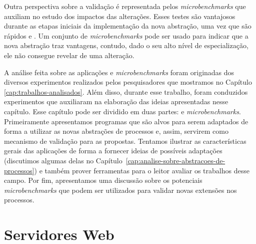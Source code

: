Outra perspectiva sobre a validação é representada pelos
\textit{microbenchmarks} que auxiliam no estudo dos impactos das alterações.
Esses testes são vantajosos durante as etapas iniciais da implementação da nova abstração, uma
vez que são rápidos e . Um conjunto de
\textit{microbenchmarks} pode ser usado para indicar que a nova abstração
traz vantagens, contudo, dado o seu alto nível de especialização, ele não
consegue revelar  de uma alteração.

A análise feita sobre as aplicações e \textit{microbenchmarks} foram originadas
dos diversos experimentos realizados pelos pesquisadores que mostramos no
Capítulo \ref{cap:trabalhos-analisados}. Além disso, durante esse trabalho,
foram conduzidos experimentos que auxiliaram na elaboração das ideias
apresentadas nesse capítulo. Esse capítulo pode ser dividido em duas partes:
 e \textit{microbenchmarks}. Primeiramente apresentamos programas que
são alvos  para serem adaptados de forma a utilizar as novas abstrações
de processos e, assim, servirem como mecanismo de validação para as propostas.
Tentamos ilustrar as características gerais das aplicações de forma a fornecer
ideias de possíveis adaptações (discutimos algumas delas
no Capítulo~\ref{cap:analise-sobre-abstracoes-de-processos}) e também prover
ferramentas para o leitor avaliar os trabalhos desse campo. Por fim,
apresentamos uma discussão sobre os potenciais \emph{microbenchmarks} que podem
ser utilizados para validar novas extensões nos processos. 

\section{Servidores Web}
\label{sec:web_server}

